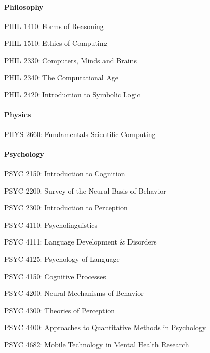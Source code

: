 \paragraph{Philosophy}
\begin{itemlist}
\item PHIL 1410: Forms of Reasoning
\item PHIL 1510: Ethics of Computing
\item PHIL 2330: Computers, Minds and Brains
\item PHIL 2340: The Computational Age
\item PHIL 2420: Introduction to Symbolic Logic
\end{itemlist}


\paragraph{Physics}
\begin{itemlist}
\item PHYS 2660: Fundamentals Scientific Computing
\end{itemlist}


\paragraph{Psychology}
\begin{itemlist}
\item PSYC 2150: Introduction to Cognition
\item PSYC 2200: Survey of the Neural Basis of Behavior
\item PSYC 2300: Introduction to Perception
\item PSYC 4110: Psycholinguistics
\item PSYC 4111: Language Development & Disorders
\item PSYC 4125: Psychology of Language
\item PSYC 4150: Cognitive Processes
\item PSYC 4200: Neural Mechanisms of Behavior
\item PSYC 4300: Theories of Perception
\item PSYC 4400: Approaches to Quantitative Methods in Psychology
\item PSYC 4682: Mobile Technology in Mental Health Research
\end{itemlist}


